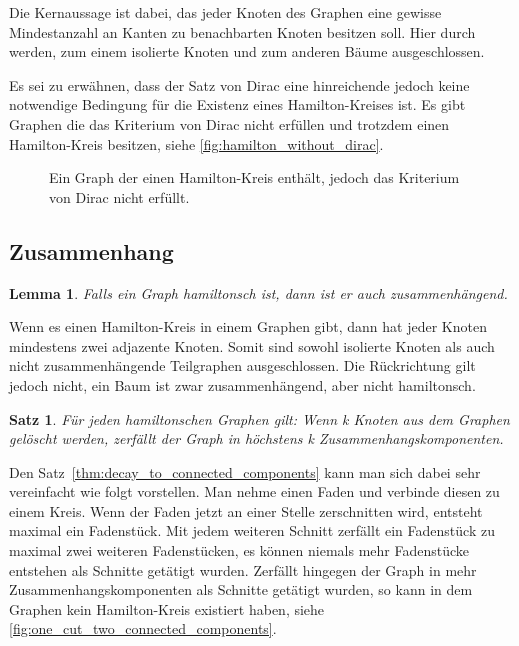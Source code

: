 \documentclass{article}
\newtheorem{mylem}{Lemma}
\newtheorem{mysat}{Satz}
\begin{document}
Die Kernaussage ist dabei, das jeder Knoten des Graphen eine gewisse Mindestanzahl an Kanten zu benachbarten Knoten besitzen soll. Hier durch werden, zum einem isolierte Knoten und zum anderen Bäume ausgeschlossen.

Es sei zu erwähnen, dass der Satz von Dirac eine hinreichende jedoch keine notwendige Bedingung für die Existenz eines Hamilton-Kreises ist. Es gibt Graphen die das Kriterium von Dirac nicht erfüllen und trotzdem einen Hamilton-Kreis besitzen, siehe \autoref{fig:hamilton_without_dirac}.

\begin{figure}
	\centering
	\caption{Ein Graph der einen Hamilton-Kreis enthält, jedoch das Kriterium von Dirac nicht erfüllt.}
	\label{fig:hamilton_without_dirac}
\end{figure}


\subsection{Zusammenhang}

\begin{mylem}
	Falls ein Graph hamiltonsch ist, dann ist er auch zusammenhängend.
\end{mylem}

Wenn es einen Hamilton-Kreis in einem Graphen gibt, dann hat jeder Knoten mindestens zwei adjazente Knoten. Somit sind sowohl isolierte Knoten als auch nicht zusammenhängende Teilgraphen ausgeschlossen. Die Rückrichtung gilt jedoch nicht, ein Baum ist zwar zusammenhängend, aber nicht hamiltonsch.

\begin{mysat}\label{thm:decay_to_connected_components}
	Für jeden hamiltonschen Graphen gilt: Wenn k Knoten aus dem Graphen gelöscht werden, zerfällt der Graph in höchstens k Zusammenhangskomponenten.
\end{mysat}

Den Satz~\autoref{thm:decay_to_connected_components} kann man sich dabei sehr vereinfacht wie folgt vorstellen. Man nehme einen Faden und verbinde diesen zu einem Kreis. Wenn der Faden jetzt an einer Stelle zerschnitten wird, entsteht maximal ein Fadenstück. Mit jedem weiteren Schnitt zerfällt ein Fadenstück zu maximal zwei weiteren Fadenstücken, es können niemals mehr Fadenstücke entstehen als Schnitte getätigt wurden. Zerfällt hingegen der Graph in mehr Zusammenhangskomponenten als Schnitte getätigt wurden, so kann in dem Graphen kein Hamilton-Kreis existiert haben, siehe \autoref{fig:one_cut_two_connected_components}.
\end{document}
